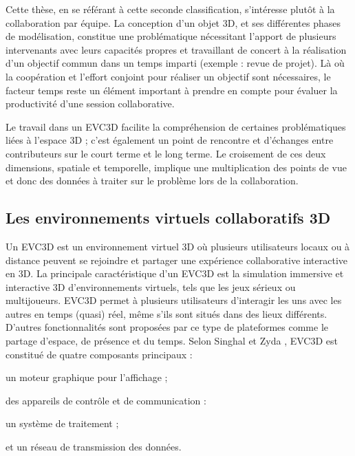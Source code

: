 Cette thèse, en se référant à cette seconde classification, s'intéresse plutôt 
à la collaboration par équipe. La conception d'un objet 3D, et ses différentes 
phases de modélisation, constitue une problématique nécessitant l'apport de 
plusieurs intervenants avec leurs capacités propres et travaillant de concert à la 
réalisation d'un objectif commun dans un temps imparti (exemple : revue de 
projet). Là où la coopération et l'effort conjoint pour réaliser un objectif sont 
nécessaires, le facteur temps reste un élément important à prendre en compte 
pour évaluer la productivité d'une session collaborative.

Le travail dans un \gls{EVC3D} facilite la compréhension 
de certaines problématiques liées à l'espace 3D ; c'est également un point de 
rencontre et d'échanges entre contributeurs sur le court terme et le long terme. 
Le croisement de ces deux dimensions, spatiale et temporelle, implique une 
multiplication des points de vue et donc des données à traiter sur le problème lors 
de la collaboration.

 
\subsection{Les environnements virtuels collaboratifs 3D}

Un \gls{EVC3D} est un environnement virtuel 3D où plusieurs utilisateurs locaux 
ou à distance peuvent se rejoindre et partager une expérience collaborative 
interactive en 3D. La principale caractéristique d'un \gls{EVC3D} est la simulation 
immersive et interactive 3D d'environnements virtuels, tels que les jeux sérieux ou 
multijoueurs. \gls{EVC3D} permet à plusieurs utilisateurs d'interagir les uns avec 
les autres en temps (quasi) réel, même s'ils sont situés dans des lieux différents. 
D'autres fonctionnalités sont proposées par ce type de plateformes comme le 
partage d'espace, de présence et du temps. Selon Singhal et Zyda 
\cite{Singhal1999}, \gls{EVC3D} est constitué de quatre composants principaux :
\begin{enumerate*}[label=(\roman*)]
	\item un moteur graphique pour l'affichage ;
	\item des appareils de contrôle et de communication :
	\item un système de traitement ;
	\item et un réseau de transmission des données. 
\end{enumerate*}

